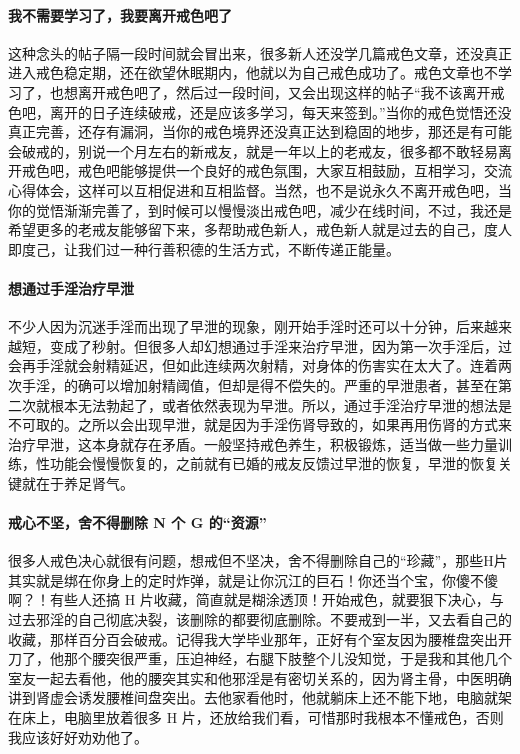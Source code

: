 \paragraph{我不需要学习了，我要离开戒色吧了} 这种念头的帖子隔一段时间就会冒出来，很多新人还没学几篇戒色文章，还没真正进入戒色稳定期，还在欲望休眠期内，他就以为自己戒色成功了。戒色文章也不学习了，也想离开戒色吧了，然后过一段时间，又会出现这样的帖子“我不该离开戒色吧，离开的日子连续破戒，还是应该多学习，每天来签到。”当你的戒色觉悟还没真正完善，还存有漏洞，当你的戒色境界还没真正达到稳固的地步，那还是有可能会破戒的，别说一个月左右的新戒友，就是一年以上的老戒友，很多都不敢轻易离开戒色吧，戒色吧能够提供一个良好的戒色氛围，大家互相鼓励，互相学习，交流心得体会，这样可以互相促进和互相监督。当然，也不是说永久不离开戒色吧，当你的觉悟渐渐完善了，到时候可以慢慢淡出戒色吧，减少在线时间，不过，我还是希望更多的老戒友能够留下来，多帮助戒色新人，戒色新人就是过去的自己，度人即度己，让我们过一种行善积德的生活方式，不断传递正能量。

\paragraph{想通过手淫治疗早泄} 不少人因为沉迷手淫而出现了早泄的现象，刚开始手淫时还可以十分钟，后来越来越短，变成了秒射。但很多人却幻想通过手淫来治疗早泄，因为第一次手淫后，过会再手淫就会射精延迟，但如此连续两次射精，对身体的伤害实在太大了。连着两次手淫，的确可以增加射精阈值，但却是得不偿失的。严重的早泄患者，甚至在第二次就根本无法勃起了，或者依然表现为早泄。所以，通过手淫治疗早泄的想法是不可取的。之所以会出现早泄，就是因为手淫伤肾导致的，如果再用伤肾的方式来治疗早泄，这本身就存在矛盾。一般坚持戒色养生，积极锻炼，适当做一些力量训练，性功能会慢慢恢复的，之前就有已婚的戒友反馈过早泄的恢复，早泄的恢复关键就在于养足肾气。

\paragraph{戒心不坚，舍不得删除 N 个 G 的“资源”} 很多人戒色决心就很有问题，想戒但不坚决，舍不得删除自己的“珍藏”，那些H片其实就是绑在你身上的定时炸弹，就是让你沉江的巨石！你还当个宝，你傻不傻啊？！有些人还搞 H 片收藏，简直就是糊涂透顶！开始戒色，就要狠下决心，与过去邪淫的自己彻底决裂，该删除的都要彻底删除。不要戒到一半，又去看自己的收藏，那样百分百会破戒。记得我大学毕业那年，正好有个室友因为腰椎盘突出开刀了，他那个腰突很严重，压迫神经，右腿下肢整个儿没知觉，于是我和其他几个室友一起去看他，他的腰突其实和他邪淫是有密切关系的，因为肾主骨，中医明确讲到肾虚会诱发腰椎间盘突出。去他家看他时，他就躺床上还不能下地，电脑就架在床上，电脑里放着很多 H 片，还放给我们看，可惜那时我根本不懂戒色，否则我应该好好劝劝他了。

